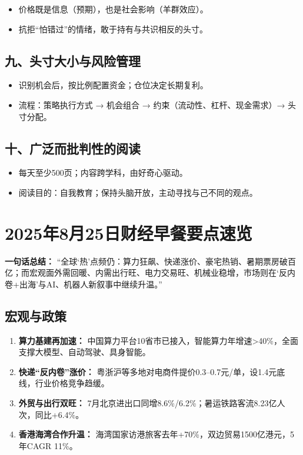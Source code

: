 \begin{itemize}
  \item 价格既是信息（预期），也是社会影响（羊群效应）。
  \item 抗拒“怕错过”的情绪，敢于持有与共识相反的头寸。
\end{itemize}

\subsection{九、头寸大小与风险管理}

\begin{itemize}
  \item 识别机会后，按比例配置资金；仓位决定长期复利。
  \item 流程：策略执行方式 → 机会组合 → 约束（流动性、杠杆、现金需求）→ 头寸分配。
\end{itemize}

\subsection{十、广泛而批判性的阅读}

\begin{itemize}
  \item 每天至少500页；内容跨学科，由好奇心驱动。
  \item 阅读目的：自我教育；保持头脑开放，主动寻找与己不同的观点。
\end{itemize}


\section{2025年8月25日财经早餐要点速览}
\textbf{一句话总结：}  
“全球‘热’点频仍：算力狂飙、快递涨价、豪宅热销、暑期票房破百亿；而宏观面外需回暖、内需出行旺、电力交易旺、机械业稳增，市场则在‘反内卷+出海’与AI、机器人新叙事中继续升温。”

\subsection{宏观与政策}
\begin{enumerate}[leftmargin=*, nosep]
    \item \textbf{算力基建再加速：} 中国算力平台10省市已接入，智能算力年增速>40\%，全面支撑大模型、自动驾驶、具身智能。
    \item \textbf{快递“反内卷”涨价：} 粤浙沪等多地对电商件提价0.3–0.7元/单，设1.4元底线，行业价格竞争趋缓。
    \item \textbf{外贸与出行双旺：} 7月北京进出口同增8.6\%/6.2\%；暑运铁路客流8.23亿人次，同比+6.4\%。
    \item \textbf{香港海湾合作升温：} 海湾国家访港旅客去年+70\%，双边贸易1500亿港元，5年CAGR 11\%。
\end{enumerate}

